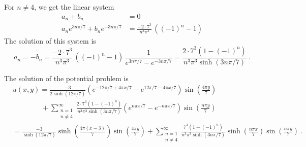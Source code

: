 \begin{egg}
For $n\neq 4$, we get the linear system
\begin{align*}
a_n + b_n &= 0 \\
a_n e^{3n\pi/7} + b_n e^{-3n \pi/7} &=
\frac{-2\cdot 7^3}{n^3\pi^3}\, \left((-1)^n - 1\right)
\end{align*}
The solution of this system is
\[
a_n = -b_n = \frac{-2\cdot 7^3}{n^3\pi^3}\,\left((-1)^n - 1\right)\,
\frac{1}{e^{3n\pi/7} - e^{-3n\pi/7}}
= \frac{2\cdot 7^3 (1 - (-1)^n)}{n^3\pi^3 \sinh(3 n\pi/7)} \ .
\]

The solution of the potential problem is
\begin{align*}
&u(x,y) = \frac{-3}{2\sinh(12\pi/7)}
  \left(e^{-12\pi/7 +4\pi x/7} - e^{12\pi/7 - 4\pi x /7}\right)
  \sin\left(\frac{4\pi y}{7}\right) \\
&\qquad\qquad + \sum_{\substack{n=1\\n\neq 4}}^\infty
\frac{2\cdot 7^3 (1 - (-1)^n)}{n^3\pi^3\sinh(3 n\pi/7)}
\left(e^{n\pi x/7} - e^{-n\pi x/7}\right)\sin\left(\frac{n\pi y}{7}\right) \\
&= \frac{-3}{\sinh(12\pi/7)}\sinh\left(\frac{4\pi(x-3)}{7}\right)
\sin\left(\frac{4\pi y}{7}\right)
+ \sum_{\substack{n=1\\n\neq 4}}^\infty
\frac{7^3 (1 - (-1)^n)}{n^3\pi^3\sinh(3 n\pi/7)}
  \sinh\left(\frac{n\pi x}{7}\right)\sin\left(\frac{n\pi y}{7}\right) \ .
\end{align*}
\end{egg}

